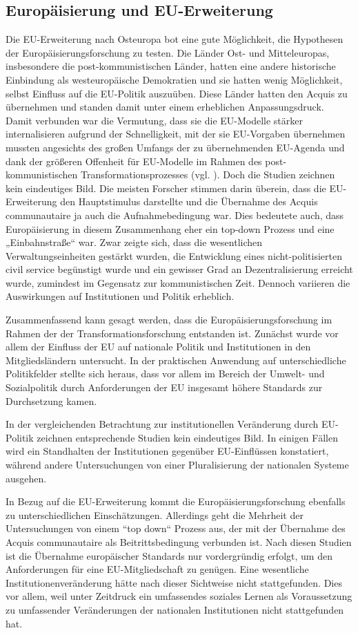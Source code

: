 \subsection{Europäisierung und EU-Erweiterung }
Die EU-Erweiterung nach Osteuropa bot eine gute Möglichkeit, die Hypothesen der Europäisierungsforschung zu testen. Die Länder Ost- und Mitteleuropas, insbesondere die post-kommunistischen Länder, hatten eine andere historische Einbindung als westeuropäische Demokratien und sie hatten wenig Möglichkeit, selbst Einfluss auf die EU-Politik auszuüben. Diese Länder hatten den Acquis zu übernehmen und standen damit unter einem erheblichen Anpassungsdruck. Damit verbunden war die Vermutung, dass sie die EU-Modelle stärker internalisieren aufgrund der Schnelligkeit, mit der sie EU-Vorgaben übernehmen mussten angesichts des großen Umfangs der zu übernehmenden EU-Agenda und dank der größeren Offenheit für EU-Modelle im Rahmen des post-kommunistischen Transformationsprozesses (vgl. \cite{grab03}). Doch die Studien zeichnen kein eindeutiges Bild. Die meisten Forscher stimmen darin überein, dass die EU-Erweiterung den Hauptstimulus darstellte und die Übernahme des Acquis communautaire ja auch die Aufnahmebedingung war. Dies bedeutete auch, dass Europäisierung in diesem Zusammenhang eher ein top-down Prozess und eine „Einbahnstraße“ war. Zwar zeigte sich, dass die wesentlichen Verwaltungseinheiten gestärkt wurden, die Entwicklung eines nicht-politisierten civil service begünstigt wurde und ein gewisser Grad an Dezentralisierung erreicht wurde, zumindest im Gegensatz zur kommunistischen Zeit. Dennoch variieren die Auswirkungen auf Institutionen und Politik erheblich.\par
Zusammenfassend kann gesagt werden, dass die Europäisierungsforschung im Rahmen der der Transformationsforschung entstanden ist. Zunächst wurde vor allem der Einfluss der EU auf nationale Politik und Institutionen in den Mitgliedsländern untersucht. In der praktischen Anwendung auf unterschiedliche Politikfelder stellte sich heraus, dass vor allem im Bereich der Umwelt- und Sozialpolitik durch Anforderungen der EU insgesamt höhere Standards zur Durchsetzung kamen.
\par
In der vergleichenden Betrachtung zur institutionellen Veränderung durch EU-Politik zeichnen entsprechende Studien kein eindeutiges Bild. In einigen Fällen wird ein Standhalten der Institutionen gegenüber EU-Einflüssen konstatiert, während andere Untersuchungen von einer Pluralisierung der nationalen Systeme ausgehen.\par
In Bezug auf die EU-Erweiterung kommt die Europäisierungsforschung ebenfalls zu unterschiedlichen Einschätzungen. Allerdings geht die Mehrheit der Untersuchungen von einem “top down“ Prozess aus, der mit der Übernahme des Acquis communautaire als Beitrittsbedingung verbunden ist. Nach diesen Studien ist die Übernahme europäischer Standards nur vordergründig erfolgt, um den Anforderungen für eine EU-Mitgliedschaft zu genügen. Eine wesentliche Institutionenveränderung hätte nach dieser Sichtweise nicht stattgefunden. Dies vor allem, weil unter Zeitdruck ein umfassendes soziales Lernen als Voraussetzung zu umfassender Veränderungen der nationalen Institutionen nicht stattgefunden hat.
